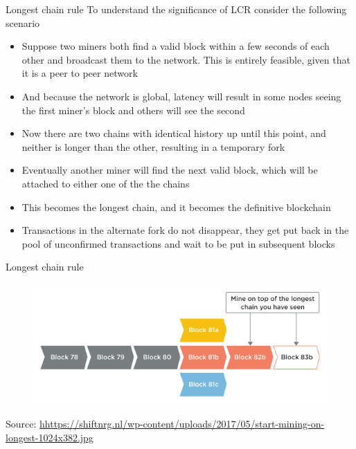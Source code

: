 \documentclass[10pt]{beamer}
\begin{document}

\begin{frame}{Longest chain rule}
	To understand the significance of LCR consider the following scenario
	\begin{itemize}
		\item Suppose two miners both find a valid block within a few seconds of each other and broadcast them to the network. This is entirely feasible, given that it is a peer to peer network
		\item And because the network is global, latency will result in some nodes seeing the first miner's block and others will see the second
		\item Now there are two chains with identical history up until this point, and neither is longer than the other, resulting in a temporary fork
		\item Eventually another miner will find the next valid block, which will be attached to either one of the the chains
		\item This becomes the longest chain, and it becomes the definitive blockchain
		\item Transactions in the alternate fork do not disappear, they get put back in the pool of unconfirmed transactions and wait to be put in subsequent blocks
	\end{itemize}
\end{frame}


\begin{frame}{Longest chain rule}
	\begin{figure}[]
		\centering
		\includegraphics  [scale=0.5]{Images/lcr}
	\end{figure}
	\begin{tiny}
		Source: \href{https://shiftnrg.nl/docs/basic-knowledge/blockchain/what-are-blockchains-problems}{hhttps://shiftnrg.nl/wp-content/uploads/2017/05/start-mining-on-longest-1024x382.jpg}
	\end{tiny}
\end{frame}
\end{document}
